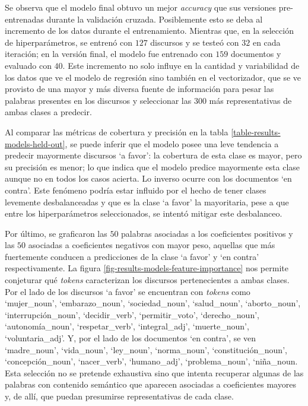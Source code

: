 Se observa que el modelo final obtuvo un mejor \textit{accuracy} que sus
versiones pre-entrenadas durante la validaci\'on cruzada. Posiblemente
esto se deba al incremento de los datos durante el entrenamiento.
Mientras que, en la selecci\'on de hiperpar\'ametros, se entren\'o con $127$ discursos
y se teste\'o con $32$ en cada iteraci\'on; en la versi\'on final, el modelo fue entrenado
con $159$ documentos y evaluado con $40$. Este incremento no solo influye en
la cantidad y variabilidad de los datos que ve el modelo de regresi\'on sino
tambi\'en en el vectorizador, que se ve provisto de una mayor y m\'as diversa fuente
de informaci\'on para pesar las palabras presentes en los discursos y seleccionar
las $300$ m\'as representativas de ambas clases a predecir.
\par
Al comparar las m\'etricas de cobertura y precisi\'on en la tabla
\ref{table-results-models-held-out}, se puede inferir que el modelo posee
una leve tendencia a predecir mayormente discursos `a favor': la cobertura
de esta clase es mayor, pero su precisi\'on es menor; lo que indica que el modelo
predice mayormente esta clase aunque no en todos los casos acierta. Lo inverso
ocurre con los documentos `en contra'. Este fen\'omeno podr\'ia estar influido
por el hecho de tener clases levemente desbalanceadas y que es la clase `a favor'
la mayoritaria, pese a que entre los hiperpar\'ametros seleccionados, se intentó
mitigar este desbalanceo.
\par
Por \'ultimo, se graficaron las $50$ palabras asociadas a los coeficientes positivos
y las $50$ asociadas a coeficientes negativos con mayor peso, aquellas que m\'as
fuertemente conducen a predicciones de la clase `a favor' y `en contra' respectivamente.
La figura \ref{fig-results-models-feature-importance} nos permite conjeturar qu\'e
\textit{tokens} caracterizan los discursos pertenecientes a ambas clases. Por el lado de los
discursos `a favor' se encuentran con \textit{tokens} como `mujer\_noun', `embarazo\_noun',
`sociedad\_noun', `salud\_noun', `aborto\_noun', `interrupción\_noun', `decidir\_verb',
`permitir\_voto', `derecho\_noun', `autonom\'ia\_noun', `respetar\_verb', `integral\_adj',
`muerte\_noun', `voluntaria\_adj'. Y, por el lado de los
documentos `en contra', se ven `madre\_noun', `vida\_noun', `ley\_noun', `norma\_noun',
`constituci\'on\_noun', `concepci\'on\_noun', `nacer\_verb',
`humano\_adj', `problema\_noun', `niña\_noun. Esta selecci\'on no se pretende exhaustiva
sino que intenta recuperar algunas de las palabras con contenido sem\'antico que aparecen
asociadas a coeficientes mayores y, de all\'i, que puedan presumirse representativas
de cada clase. 

